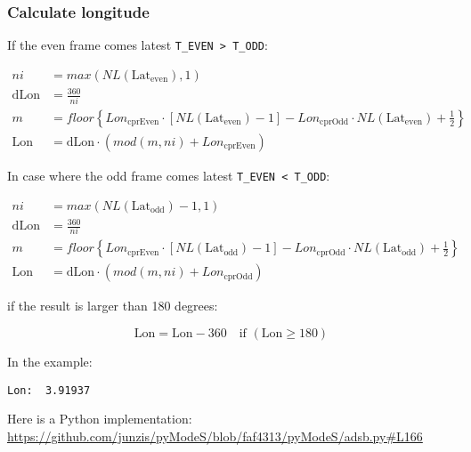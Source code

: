 \subsubsection{Calculate longitude}\label{calculate-longitude}

If the even frame comes latest \texttt{T\_EVEN\ \textgreater{}\ T\_ODD}:

\begin{equation}
  \begin{split}
    ni &= max \left( NL(\mathrm{Lat}_\mathrm{even}), 1 \right) \\
    \mathrm{dLon} &= \frac{360}{ni} \\
    m &= floor \left\{ Lon_\mathrm{cprEven} \cdot [NL(\mathrm{Lat}_\mathrm{even})-1] - Lon_\mathrm{cprOdd} \cdot NL(\mathrm{Lat}_\mathrm{even}) + \frac{1}{2}  \right\} \\
    \mathrm{Lon} &= \mathrm{dLon} \cdot \left( mod(m, ni) + Lon_\mathrm{cprEven} \right)
  \end{split}
\end{equation}

In case where the odd frame comes latest
\texttt{T\_EVEN\ \textless{}\ T\_ODD}:

\begin{equation}
  \begin{split}
    ni &= max \left( NL(\mathrm{Lat}_\mathrm{odd})-1, 1 \right) \\
    \mathrm{dLon} &= \frac{360}{ni} \\
    m &= floor \left\{ Lon_\mathrm{cprEven} \cdot [NL(\mathrm{Lat}_\mathrm{odd})-1] - Lon_\mathrm{cprOdd} \cdot NL(\mathrm{Lat}_\mathrm{odd}) + \frac{1}{2}  \right\} \\
    \mathrm{Lon} &= \mathrm{dLon} \cdot \left( mod(m, ni) + Lon_\mathrm{cprOdd} \right)
  \end{split}
\end{equation}

if the result is larger than 180 degrees:

\begin{equation}
  \mathrm{Lon} = \mathrm{Lon} - 360  \quad \text{if } (\mathrm{Lon} \geq 180)
\end{equation}

In the example:

\begin{verbatim}
Lon:  3.91937
\end{verbatim}

Here is a Python implementation:
\url{https://github.com/junzis/pyModeS/blob/faf4313/pyModeS/adsb.py\#L166}

